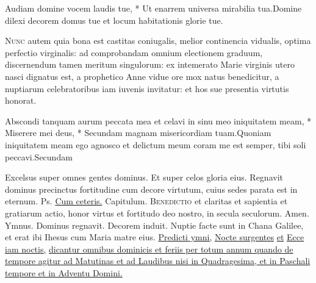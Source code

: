 \begin{multicols*}{2}
\begin{responsory}
{Audiam domine vocem laudis tue, * Ut enarrem universa mirabilia tua.}{Domine dilexi decorem domus tue et locum habitationis glorie tue.}
\end{responsory}
\lettrine[lines=2]{\zallmancaps \color{Blue} N}{unc} autem quia bona est castitas coniugalis, melior continencia vidualis, optima perfectio virginalis: ad comprobandam omnium electionem graduum, discernendum tamen meritum singulorum: ex intemerato Marie virginis utero nasci dignatus est, a prophetico Anne vidue ore mox natus benedicitur, a nuptiarum celebratoribus iam iuvenis invitatur: et hos sue presentia virtutis honorat.
\begin{responsory-final}
{Abscondi tanquam aurum peccata mea et celavi in sinu meo iniquitatem meam, * Miserere mei deus, * Secundam magnam misericordiam tuam.}{Quoniam iniquitatem meam ego agnosco et delictum meum coram me est semper, tibi soli peccavi.}{Secundam}
\end{responsory-final}
\newline \V Excelsus super omnes gentes dominus. \R Et super celos gloria eius.
 Regnavit dominus precinctus fortitudine cum decore virtutum, cuius sedes parata est in eternum. {\color{Red} Ps.}  \ul{Cum ceteris.} {\color{Red} Capitulum.}
\lettrine[lines=2]{\zallmancaps \color{Red} B}{enedictio} et claritas et sapientia et gratiarum actio, honor virtus et fortitudo deo nostro, in secula seculorum. Amen. {\color{Red} Ymnus.}
\newline \V Dominus regnavit. \R Decorem induit.
 Nuptie facte sunt in Chana Galilee, et erat ibi Ihesus cum Maria matre eius.
\newline \ul{Predicti ymni,} \hyperlink{nocte-surgentes}{Nocte surgentes} \ul{et} \hyperlink{ecce-iam-noctis}{Ecce iam noctis,} \ul{dicantur omnibus dominicis et feriis per totum annum quando de tempore agitur ad Matutinas et ad Laudibus nisi in Quadragesima, et in Paschali tempore et in Adventu Domini.}

\end{multicols*}
